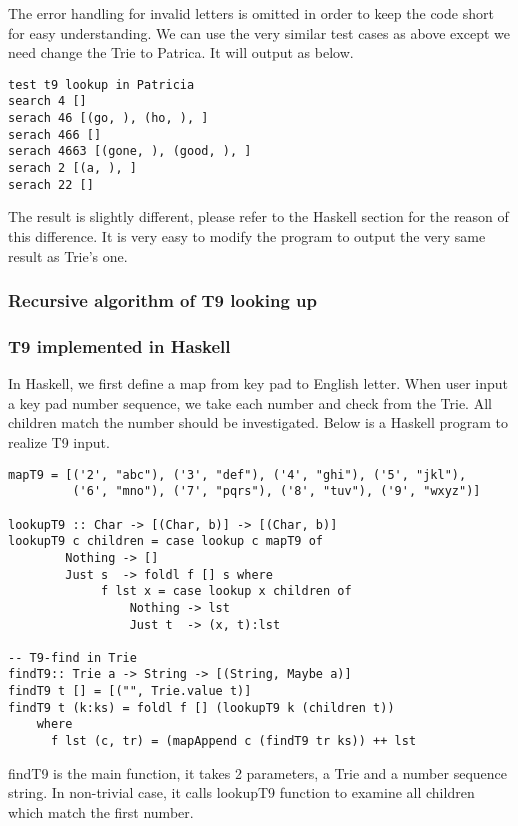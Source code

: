 \documentclass{article}
\begin{document}
The error handling for invalid letters is omitted in order to keep the
code short for easy understanding. We can use the very similar test
cases as above except we need change the Trie to Patrica. It will
output as below.

\begin{verbatim}
test t9 lookup in Patricia
search 4 []
serach 46 [(go, ), (ho, ), ]
serach 466 []
serach 4663 [(gone, ), (good, ), ]
serach 2 [(a, ), ]
serach 22 []
\end{verbatim}

The result is slightly different, please refer to the Haskell section
for the reason of this difference. It is very easy to modify the
program to output the very same result as Trie's one.

\subsubsection{Recursive algorithm of T9 looking up}

\subsubsection*{T9 implemented in Haskell}

In Haskell, we first define a map from key pad to English letter. When user
input a key pad number sequence, we take each number and check from the Trie.
All children match the number should be investigated. Below is a Haskell 
program to realize T9 input.

\lstset{language=Haskell}
\begin{lstlisting}
mapT9 = [('2', "abc"), ('3', "def"), ('4', "ghi"), ('5', "jkl"), 
         ('6', "mno"), ('7', "pqrs"), ('8', "tuv"), ('9', "wxyz")]

lookupT9 :: Char -> [(Char, b)] -> [(Char, b)]
lookupT9 c children = case lookup c mapT9 of
        Nothing -> []
        Just s  -> foldl f [] s where
             f lst x = case lookup x children of
                 Nothing -> lst
                 Just t  -> (x, t):lst
        
-- T9-find in Trie
findT9:: Trie a -> String -> [(String, Maybe a)]
findT9 t [] = [("", Trie.value t)]
findT9 t (k:ks) = foldl f [] (lookupT9 k (children t))
    where
      f lst (c, tr) = (mapAppend c (findT9 tr ks)) ++ lst
\end{lstlisting}

findT9 is the main function, it takes 2 parameters, a Trie and a number
sequence string. In non-trivial case, it calls lookupT9 function to
examine all children which match the first number.
\end{document}
